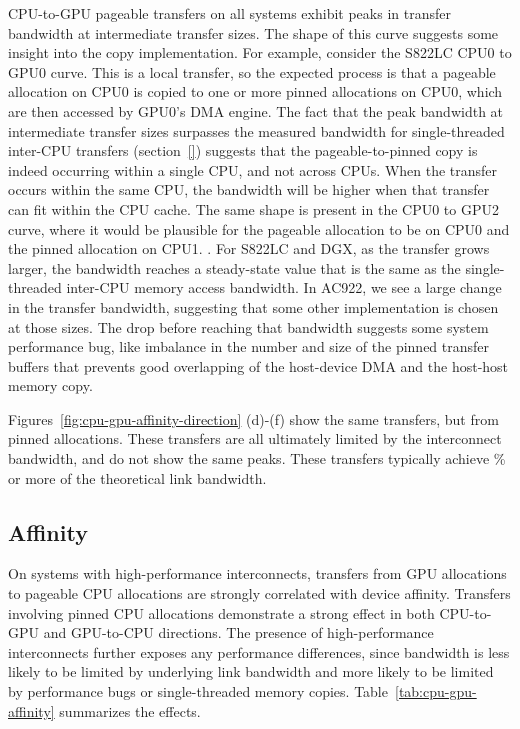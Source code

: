 CPU-to-GPU pageable transfers on all systems exhibit peaks in transfer bandwidth at intermediate transfer sizes.
The shape of this curve suggests some insight into the copy implementation.
For example, consider the S822LC CPU0 to GPU0 curve.
This is a local transfer, so the expected process is that a pageable allocation on CPU0 is copied to one or more pinned allocations on CPU0, which are then accessed by GPU0's DMA engine.
The fact that the peak bandwidth at intermediate transfer sizes surpasses the measured bandwidth for single-threaded inter-CPU transfers (section~\ref{}) suggests that the pageable-to-pinned copy is indeed occurring within a single CPU, and not across CPUs.
When the transfer occurs within the same CPU, the bandwidth will be higher when that transfer can fit within the CPU cache.
The same shape is present in the CPU0 to GPU2 curve, where it would be plausible for the pageable allocation to be on CPU0 and the pinned allocation on CPU1.
.
For S822LC and DGX, as the transfer grows larger, the bandwidth reaches a steady-state value that is the same as the single-threaded inter-CPU memory access bandwidth.
In AC922, we see a large change in the transfer bandwidth, suggesting that some other implementation is chosen at those sizes.
The drop before reaching that bandwidth suggests some system performance bug, like imbalance in the number and size of the pinned transfer buffers that prevents good overlapping of the host-device DMA and the host-host memory copy.

Figures~\ref{fig:cpu-gpu-affinity-direction} (d)-(f) show the same transfers, but from pinned allocations.
These transfers are all ultimately limited by the interconnect bandwidth, and do not show the same peaks.
These transfers typically achieve \% or more of the theoretical link bandwidth.

\subsection{Affinity}
\label{sec:explicit-cpu-gpu-affinity}

On systems with high-performance interconnects, transfers from GPU allocations to pageable CPU allocations are strongly correlated with device affinity.
Transfers involving pinned CPU allocations demonstrate a strong effect in both CPU-to-GPU and GPU-to-CPU directions.
The presence of high-performance interconnects further exposes any performance differences, since bandwidth is less likely to be limited by underlying link bandwidth and more likely to be limited by performance bugs or single-threaded memory copies.
Table~\ref{tab:cpu-gpu-affinity} summarizes the effects.

